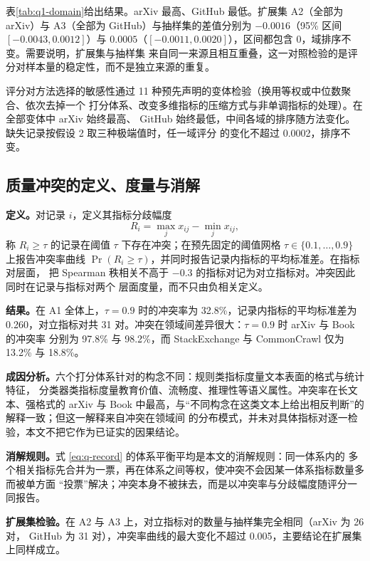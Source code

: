 表\ref{tab:q1-domain}给出结果。arXiv 最高、GitHub 最低。扩展集 A2（全部为 arXiv）与
A3（全部为 GitHub）与抽样集的差值分别为 $-0.0016$（95\% 区间 $[-0.0043, 0.0012]$）与
$0.0005$（$[-0.0011, 0.0020]$），区间都包含 0，域排序不变。需要说明，扩展集与抽样集
来自同一来源且相互重叠，这一对照检验的是评分对样本量的稳定性，而不是独立来源的重复。

评分对方法选择的敏感性通过 11 种预先声明的变体检验（换用等权或中位数聚合、依次去掉一个
打分体系、改变多维指标的压缩方式与非单调指标的处理）。在全部变体中 arXiv 始终最高、
GitHub 始终最低，中间各域的排序随方法变化。缺失记录按假设 2 取三种极端值时，任一域评分
的变化不超过 0.0002，排序不变。

\subsection{质量冲突的定义、度量与消解}

\textbf{定义。}对记录 $i$，定义其指标分歧幅度
\begin{equation}
  R_i=\max_{j}x_{ij}-\min_{j}x_{ij},
\end{equation}
称 $R_i\ge\tau$ 的记录在阈值 $\tau$ 下存在冲突；在预先固定的阈值网格 $\tau\in\{0.1,\dots,0.9\}$
上报告冲突率曲线 $\Pr(R_i\ge\tau)$，并同时报告记录内指标的平均标准差。在指标对层面，
把 Spearman 秩相关不高于 $-0.3$ 的指标对记为对立指标对。冲突因此同时在记录与指标对两个
层面度量，而不只由负相关定义。

\textbf{结果。}在 A1 全体上，$\tau=0.9$ 时的冲突率为 32.8\%，记录内指标的平均标准差为
0.260，对立指标对共 31 对。冲突在领域间差异很大：$\tau=0.9$ 时 arXiv 与 Book 的冲突率
分别为 97.8\% 与 98.2\%，而 StackExchange 与 CommonCrawl 仅为 13.2\% 与 18.8\%。

\textbf{成因分析。}六个打分体系针对的构念不同：规则类指标度量文本表面的格式与统计特征，
分类器类指标度量教育价值、流畅度、推理性等语义属性。冲突率在长文本、强格式的 arXiv 与
Book 中最高，与“不同构念在这类文本上给出相反判断”的解释一致；但这一解释来自冲突在领域间
的分布模式，并未对具体指标对逐一检验，本文不把它作为已证实的因果结论。

\textbf{消解规则。}式 \eqref{eq:q-record} 的体系平衡平均是本文的消解规则：同一体系内的
多个相关指标先合并为一票，再在体系之间等权，使冲突不会因某一体系指标数量多而被单方面
“投票”解决；冲突本身不被抹去，而是以冲突率与分歧幅度随评分一同报告。

\textbf{扩展集检验。}在 A2 与 A3 上，对立指标对的数量与抽样集完全相同（arXiv 为 26 对，
GitHub 为 31 对），冲突率曲线的最大变化不超过 0.005，主要结论在扩展集上同样成立。

